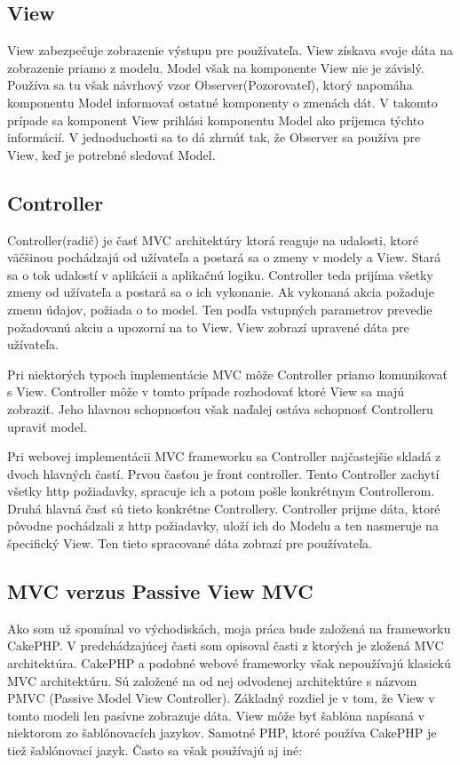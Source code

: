 \documentclass[12pt,oneside]{book}
\begin{document}
\subsection{View}
View zabezpečuje zobrazenie výstupu pre používateľa. View získava svoje dáta na zobrazenie priamo z modelu. Model však na komponente View nie je závislý. Používa sa tu však návrhový vzor Observer(Pozorovateľ), ktorý napomáha komponentu Model  informovať ostatné komponenty o zmenách dát. V takomto prípade sa komponent View prihlási komponentu Model ako príjemca týchto informácií. V jednoduchosti sa to dá zhrnúť tak, že Observer sa používa pre View, keď je potrebné sledovať Model.



\subsection{Controller}
Controller(radič) je časť MVC architektúry ktorá reaguje na udalosti, ktoré väčšinou pochádzajú od užívateľa a postará sa o zmeny v modely a View.  Stará sa o tok udalostí v aplikácii a aplikačnú logiku. Controller teda prijíma všetky zmeny od užívateľa a postará sa o ich vykonanie. Ak vykonaná akcia požaduje zmenu údajov, požiada o to model. Ten podľa vstupných parametrov prevedie požadovanú akciu a upozorní na to View. View zobrazí upravené dáta pre užívateľa.

Pri niektorých typoch implementácie MVC môže Controller priamo komunikovať s View. Controller môže v tomto prípade rozhodovať ktoré View sa majú zobraziť. Jeho hlavnou schopnosťou však naďalej ostáva schopnosť Controlleru upraviť model.

Pri webovej implementácii MVC frameworku sa Controller najčastejšie skladá z dvoch hlavných častí. Prvou časťou je front controller. Tento Controller zachytí všetky http požiadavky, spracuje ich a potom pošle konkrétnym Controllerom. Druhá hlavná časť sú tieto konkrétne Controllery. Controller prijme dáta, ktoré pôvodne pochádzali z http požiadavky, uloží ich do Modelu a ten nasmeruje na špecifický View. Ten tieto spracované dáta zobrazí pre používateľa.

\subsection{MVC verzus Passive View MVC}
Ako som už spomínal vo východiskách, moja práca bude založená na frameworku CakePHP. V predchádzajúcej časti som opisoval časti z ktorých je zložená MVC architektúra. CakePHP a podobné webové frameworky však nepoužívajú klasickú MVC architektúru. Sú založené na od nej odvodenej architektúre s názvom PMVC (Passive Model View Controller). Základný rozdiel je v tom, že View v tomto modeli len pasívne zobrazuje dáta. View môže byť šablóna napísaná v niektorom zo šablónovacích jazykov. Samotné PHP, ktoré používa CakePHP je tiež šablónovací jazyk. Často sa však používajú aj iné: 
\end{document}
